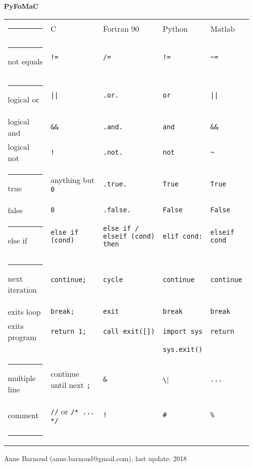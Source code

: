 \documentclass[a5paper,10pt,landscape]{article}
\makeatletter
\def\hlinewd#1{%
\noalign{\ifnum0=`}\fi\hrule \@height #1 %
\futurelet\reserved@a\@xhline}
\newcommand{\hhline}{\hlinewd{1pt}}	%
\renewcommand{\hline}{\hlinewd{0.1pt}}	%
\makeatother
\begin{document}
\pagestyle{empty}

\begin{center}

\Huge{\textbf{PyFoMaC}}
\normalsize

\bigskip

\bigskip

\begin{tabular}{p{2.5cm} p{3.5cm} p{5.5cm} p{2cm} p{2cm}}
\hhline
 			& C		& Fortran 90		& Python 		& Matlab 	\\ 
\hhline
not equals		& \verb|!=|		& \verb|/=| 	& \verb|!=| 		& \verb|~=|	\\
\hline
logical or		& \verb=||=		& \texttt{.or.}	& \verb|or| 		& \verb=||= 	\\
logical and		& \verb|&&|		& \texttt{.and.} 	& \verb|and| 		& \verb|&&| 	\\
logical not		& \verb|!|		& \texttt{.not.} 	& \verb|not| 		& \verb|~| 	\\
\hline
true			& anything but \verb|0| & \texttt{.true.} 	& \verb|True| 		& \verb|True| 		\\
false		& \verb|0|			& \texttt{.false.} 	& \verb|False| 		& \verb|False| 		\\
\hline
else if		& \verb|else if (cond)|	& \verb|else if / elseif (cond) then| & \verb|elif cond:| & \verb|elseif cond|								\\
\hline
%
next iteration	& \verb|continue;|	& \verb|cycle| 		& \verb|continue| 	& \verb|continue| 	\\
exits loop		& \verb|break;|		& \verb|exit| 	& \verb|break| 		& \verb|break| 	\\	
exits program	& \verb|return 1;|	& \verb|call exit([])| & \verb|import sys| & \verb|return|	\\
& & & \verb|sys.exit()| & \\
\hline
multiple line & continue until next \verb|;|	& \verb|&| 	& \verb|\| 		& \verb|...| 		\\
comment & \verb|//| or \verb|/* ... */| & \verb|!| & \verb|#| & \verb|%| \\
\hhline
\end{tabular}
\end{center}

\vfill
Anne Barnoud (anne.barnoud@gmail.com), last update: 2018%
\end{document}
